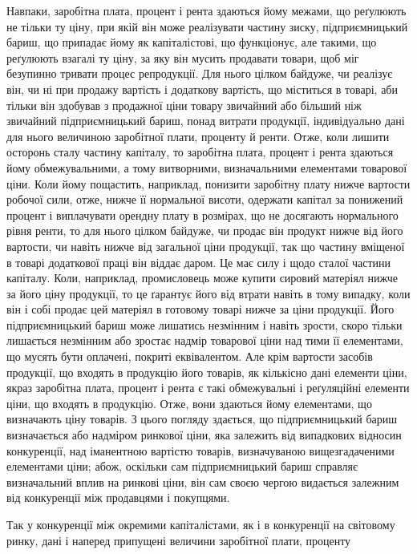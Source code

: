 Навпаки, заробітна плата, процент і рента здаються йому межами, що
реґулюють не тільки ту ціну, при якій він може реалізувати частину зиску,
підприємницький бариш, що припадає йому як капіталістові, що функціонує,
але такими, що реґулюють взагалі ту ціну, за яку він мусить продавати товари,
щоб міг безупинно тривати процес репродукції. Для нього цілком байдуже, чи
реалізує він, чи ні при продажу вартість і додаткову вартість, що міститься в
товарі, аби тільки він здобував з продажної ціни товару звичайний або більший
ніж звичайний підприємницький бариш, понад витрати продукції, індивідуально
дані для нього величиною заробітної плати, проценту й ренти. Отже, коли лишити
осторонь сталу частину капіталу, то заробітна плата, процент і рента здаються
йому обмежувальними, а тому витворними, визначальними елементами товарової
ціни. Коли йому пощастить, наприклад, понизити заробітну плату нижче вартости
робочої сили, отже, нижче її нормальної висоти, одержати капітал за понижений
процент і виплачувати орендну плату в розмірах, що не досягають
нормального рівня ренти, то для нього цілком байдуже, чи продає він продукт
нижче від його вартости, чи навіть нижче від загальної ціни продукції,
так що частину вміщеної в товарі додаткової праці він віддає даром. Це
має силу і щодо сталої частини капіталу. Коли, наприклад, промисловець
може купити сировий матеріял нижче за його ціну продукції, то це ґарантує
його від втрати навіть в тому випадку, коли він і собі продає цей матеріял
в готовому товарі нижче за ціни продукції. Його підприємницький бариш
може лишатись незмінним і навіть зрости, скоро тільки лишається незмінним
або зростає надмір товарової ціни над тими її елементами, що мусять
бути оплачені, покриті еквівалентом. Але крім вартости засобів продукції, що
входять в продукцію його товарів, як кількісно дані елементи ціни, якраз
заробітна плата, процент і рента є такі обмежувальні і реґуляційні елементи
ціни, що входять в продукцію. Отже, вони здаються йому елементами, що
визначають ціну товарів. З цього погляду здається, що підприємницький бариш
визначається або надміром ринкової ціни, яка залежить від випадкових
відносин конкуренції, над іманентною вартістю товарів, визначуваною вищезгадаченими
елементами ціни; абож, оскільки сам підприємницький бариш справляє
визначальний вплив на ринкові ціни, він сам своєю чергою видається залежним
від конкуренції між продавцями і покупцями.

Так у конкуренції між окремими капіталістами, як і в конкуренції на світовому
ринку, дані і наперед припущені величини заробітної плати, проценту
